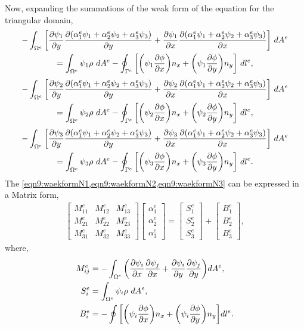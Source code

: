 \documentclass[main.tex]{subfiles}
\begin{document}
Now, expanding the summations of the weak form of the equation for the triangular domain,
\begin{multline}
    - \int_{\Omega^e}
        \qty[\pdv{\psi_1}{y}\pdv{\qty(\alpha_1^e\psi_1+\alpha_2^e\psi_2+\alpha_3^e\psi_3)}{y}+\pdv{\psi_1}{x}\pdv{\qty(\alpha_1^e\psi_1+\alpha_2^e\psi_2+\alpha_3^e\psi_3)}{x}]~dA^e
    \\
    = \int_{\Omega^e}\psi_1\rho~dA^e
    -\oint_{\Gamma^e}\qty[\qty(\psi_1\pdv{\phi}{x})n_x+\qty(\psi_1\pdv{\phi}{y})n_y]~dl^e,\label{eqn9:waekformN1}
\end{multline}
\begin{multline}
    - \int_{\Omega^e}
        \qty[\pdv{\psi_2}{y}\pdv{\qty(\alpha_1^e\psi_1+\alpha_2^e\psi_2+\alpha_3^e\psi_3)}{y}+\pdv{\psi_2}{x}\pdv{\qty(\alpha_1^e\psi_1+\alpha_2^e\psi_2+\alpha_3^e\psi_3)}{x}]~dA^e
    \\
    = \int_{\Omega^e}\psi_2\rho~dA^e
    -\oint_{\Gamma^e}\qty[\qty(\psi_2\pdv{\phi}{x})n_x+\qty(\psi_2\pdv{\phi}{y})n_y]~dl^e,\label{eqn9:waekformN2}
\end{multline}
\begin{multline}
    - \int_{\Omega^e}
        \qty[\pdv{\psi_3}{y}\pdv{\qty(\alpha_1^e\psi_1+\alpha_2^e\psi_2+\alpha_3^e\psi_3)}{y}+\pdv{\psi_3}{x}\pdv{\qty(\alpha_1^e\psi_1+\alpha_2^e\psi_2+\alpha_3^e\psi_3)}{x}]~dA^e
    \\
    = \int_{\Omega^e}\psi_3\rho~dA^e
    -\oint_{\Gamma^e}\qty[\qty(\psi_3\pdv{\phi}{x})n_x+\qty(\psi_3\pdv{\phi}{y})n_y]~dl^e.\label{eqn9:waekformN3}
\end{multline}
The \cref{eqn9:waekformN1,eqn9:waekformN2,eqn9:waekformN3} can be expressed in a Matrix form, 
\begin{gather}
    \begin{bmatrix}
        M_{11}^e & M_{12}^e & M_{13}^e \\
        M_{21}^e & M_{22}^e & M_{23}^e \\
        M_{31}^e & M_{32}^e & M_{33}^e 
    \end{bmatrix}
    \begin{bmatrix}
        \alpha_1^e \\ \alpha_2^e \\ \alpha_3^e
    \end{bmatrix}
    =
    \begin{bmatrix}
        S_1^e \\ S_2^e \\ S_3^e
    \end{bmatrix}
    +
    \begin{bmatrix}
        B_1^e \\ B_2^e \\ B_3^e
    \end{bmatrix}
    ,\label{eqn9:weakMatrixform}
\end{gather}
where,
\begin{align*}
    M_{ij}^e &= -\int_{\Omega^e}\qty(\pdv{\psi_i}{x}\pdv{\psi_j}{x}+\pdv{\psi_i}{y}\pdv{\psi_j}{y})dA^e, \\
    S_i^e &= \int_{\Omega^e}\psi_i\rho~dA^e, \\
    B_{i}^e &= -\oint\qty[\qty(\psi_i\pdv{\phi}{x})n_x+\qty(\psi_i\pdv{\phi}{y})n_y]dl^e.
\end{align*}
\end{document}
